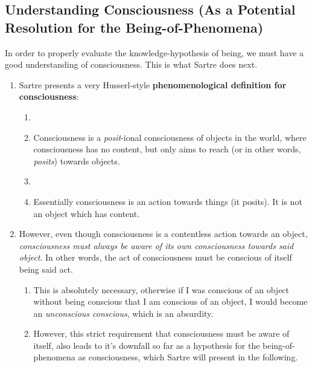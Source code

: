 \subsection{Understanding Consciousness (As a Potential Resolution for the Being-of-Phenomena)}
In order to properly evaluate the knowledge-hypothesis of being, we must have a good understanding of consciousness. This is what Sartre does next.

\begin{enumerate}
  \item Sartre presents a very Husserl-style \textbf{phenomenological definition for consciousness}:
  \begin{enumerate}
    \item {}
    \item Consciousness is a \emph{posit}-ional consciousness of objects in the world, where consciousness has no content, but only aims to reach (or in other words, \emph{posits}) towards objects.
    \item {}
    \item Essentially consciousness is an action towards things (it posits). It is not an object which has content.
  \end{enumerate}
  \item However, even though consciousness is a contentless action towards an object, \emph{consciousness must always be aware of its own consciousness towards said object}. In other words, the act of consciousness must be conscious of itself being said act.
  \begin{enumerate}
    \item This is absolutely necessary, otherwise if I was conscious of an object without being conscious that I am conscious of an object, I would become an \emph{unconscious conscious}, which is an absurdity.
    \item However, this strict requirement that consciousness must be aware of itself, also leads to it's downfall so far as a hypothesis for the being-of-phenomena as consciousness, which Sartre will present in the following.
  \end{enumerate}
\end{enumerate}

